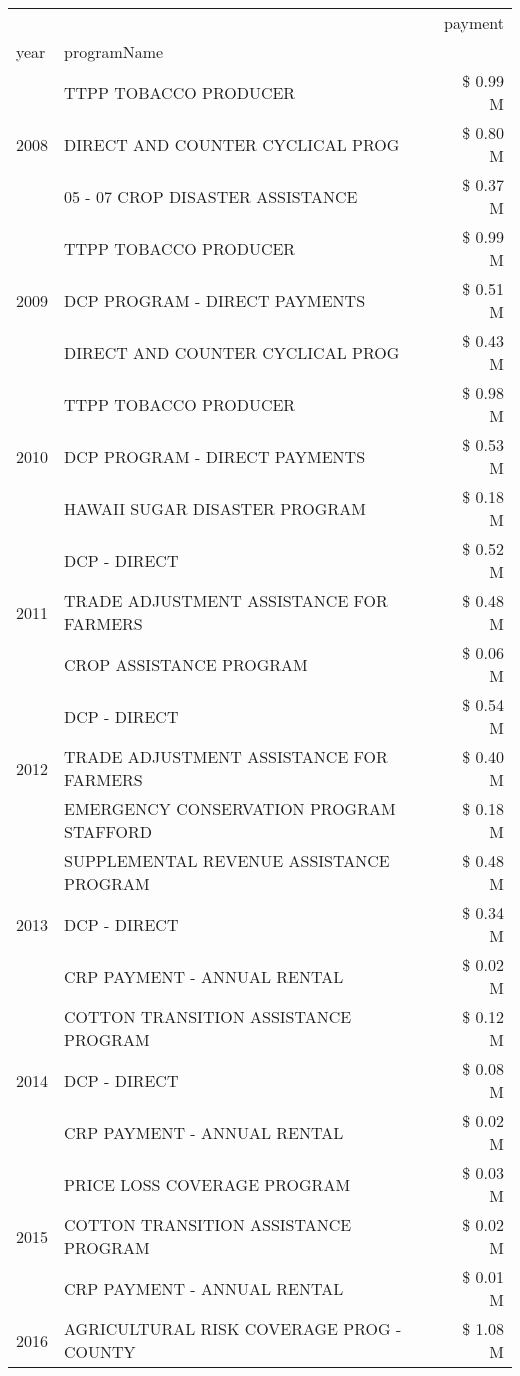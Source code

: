 \begin{tabular}{llr}
\toprule
 &  & payment \\
year & programName &  \\
\midrule
\multirow[t]{3}{*}{2008} & TTPP TOBACCO PRODUCER & \$ 0.99 M \\
 & DIRECT AND COUNTER CYCLICAL PROG & \$ 0.80 M \\
 & 05 - 07 CROP DISASTER ASSISTANCE & \$ 0.37 M \\
\cline{1-3}
\multirow[t]{3}{*}{2009} & TTPP TOBACCO PRODUCER & \$ 0.99 M \\
 & DCP PROGRAM - DIRECT PAYMENTS & \$ 0.51 M \\
 & DIRECT AND COUNTER CYCLICAL PROG & \$ 0.43 M \\
\cline{1-3}
\multirow[t]{3}{*}{2010} & TTPP TOBACCO PRODUCER & \$ 0.98 M \\
 & DCP PROGRAM - DIRECT PAYMENTS & \$ 0.53 M \\
 & HAWAII SUGAR DISASTER PROGRAM & \$ 0.18 M \\
\cline{1-3}
\multirow[t]{3}{*}{2011} & DCP - DIRECT & \$ 0.52 M \\
 & TRADE ADJUSTMENT ASSISTANCE FOR FARMERS & \$ 0.48 M \\
 & CROP ASSISTANCE PROGRAM & \$ 0.06 M \\
\cline{1-3}
\multirow[t]{3}{*}{2012} & DCP - DIRECT & \$ 0.54 M \\
 & TRADE ADJUSTMENT ASSISTANCE FOR FARMERS & \$ 0.40 M \\
 & EMERGENCY CONSERVATION PROGRAM STAFFORD & \$ 0.18 M \\
\cline{1-3}
\multirow[t]{3}{*}{2013} & SUPPLEMENTAL REVENUE ASSISTANCE PROGRAM & \$ 0.48 M \\
 & DCP - DIRECT & \$ 0.34 M \\
 & CRP PAYMENT - ANNUAL RENTAL & \$ 0.02 M \\
\cline{1-3}
\multirow[t]{3}{*}{2014} & COTTON TRANSITION ASSISTANCE PROGRAM & \$ 0.12 M \\
 & DCP - DIRECT & \$ 0.08 M \\
 & CRP PAYMENT - ANNUAL RENTAL & \$ 0.02 M \\
\cline{1-3}
\multirow[t]{3}{*}{2015} & PRICE LOSS COVERAGE PROGRAM & \$ 0.03 M \\
 & COTTON TRANSITION ASSISTANCE PROGRAM & \$ 0.02 M \\
 & CRP PAYMENT - ANNUAL RENTAL & \$ 0.01 M \\
\cline{1-3}
\multirow[t]{3}{*}{2016} & AGRICULTURAL RISK COVERAGE PROG - COUNTY & \$ 1.08 M \\

\end{tabular}
